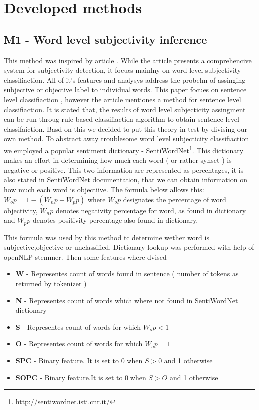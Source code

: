 \chapter{Developed methods}

\section{M1 - Word level subjectivity inference}

This method was inspired by article \cite{kamal2013}. While the article presents a comprehencive system for subjectivity detection, 
it focues mainlny on word level subjectivity classifiaction. All of it's features and analysys address the probelm of assinging subjective or objective label to individual words. This paper 
focues on sentence level classifiaction , however the article mentiones a method for sentence level classifiaction. It is stated that, the results of word level subjecticity assingment can
be run throug rule based classifiaction algorithm to obtain sentence level classifaiction. Basd on this we decided to put this theory in test by divising our own method. 
To abstract away troublesome word level subjecticity classifiaction we employed a popular sentiment dictionary - SentiWordNet\footnote{ http://sentiwordnet.isti.cnr.it/ }.  
This dictionary makes an effort in determining how much each word ( or rather synset ) is negative or positive. This two information are represented as percentages, it is also stated in 
SentiWordNet documentation, that we can obtain information on how much each word is objectiive. The formula below allows this: \( W_op = 1 - (W_np+W_pp)  \) where \( W_op \) designates the 
percentage of word objectivity, \( W_np \) denotes negativity percentage for word, as found in dictionary and \( W_pp \) denotes positivity percentage also found in dictionary. 

This formula was used by this method to determine wether word is subjective,objective or unclassified. Dictionary lookup was performed with help of openNLP stemmer. Then some features where dvised

\begin{itemize}
\item \textbf{W} - Representes count of words found in sentence ( number of tokens as returned by tokenizer )
\item \textbf{N} - Representes count of words which where not found in SentiWordNet dictionary
\item \textbf{S} - Representes count of words for which \( W_op < 1 \)
\item \textbf{O} - Representes count of words for which \( W_op = 1 \)
\item \textbf{SPC} - Binary feature. It is set to 0 when \( S > 0 \) and 1 otherwise
\item \textbf{SOPC} - Binary feature.It is set to 0 when \( S > O \) and 1 otherwise
\end{itemize}


